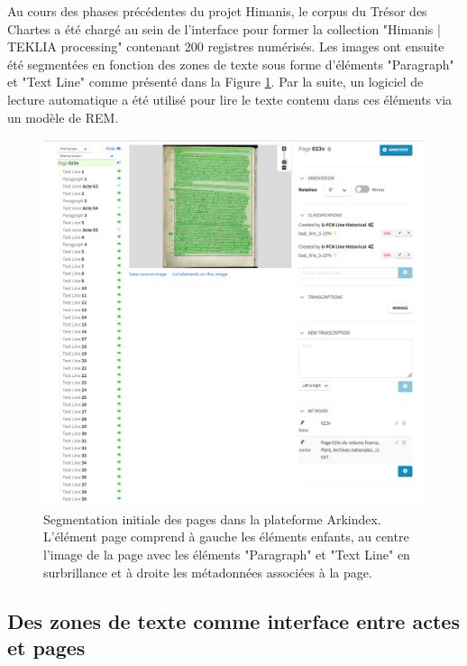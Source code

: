 \documentclass[a4paper,12pt,twoside]{book}
\begin{document}
	Au cours des phases précédentes du projet Himanis, le corpus du Trésor des Chartes a été chargé au sein de l'interface pour former la collection "Himanis | TEKLIA processing" contenant 200 registres numérisés. Les images ont ensuite été segmentées en fonction des zones de texte sous forme d'éléments "Paragraph" et "Text Line" comme présenté dans la Figure \ref{Page_Initiale_Arkindex}. Par la suite, un logiciel de lecture automatique a été utilisé pour lire le texte contenu dans ces éléments via un modèle de REM.
	
	\begin{figure}
		\centering
		\includegraphics[width=\textwidth]{Images/Interface_Arkindex.png}
		\caption{Segmentation initiale des pages dans la plateforme Arkindex. L'élément page comprend à gauche les éléments enfants, au centre l'image de la page avec les éléments "Paragraph" et "Text Line" en surbrillance et à droite les métadonnées associées à la page.}
		\label{Page_Initiale_Arkindex}
	\end{figure}
	
	
	\subsection{Des zones de texte comme interface entre actes et pages}
	
\end{document}
